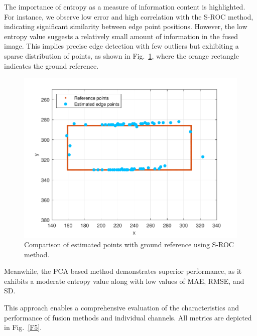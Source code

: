 \documentclass{article}
\begin{document}
The importance of entropy  as a measure of information content is highlighted. For instance,  we observe low error and high correlation with the S-ROC method, indicating significant similarity between edge point positions. However, the low entropy value suggests a relatively small amount of information in the fused image. This implies precise edge detection with few outliers but exhibiting a sparse distribution of points, as shown in Fig.~\ref{F4}, where the orange rectangle indicates the ground reference.  \vspace{-0.45cm}
\begin{figure}[H] 
\centering
	\includegraphics[scale=0.5]{figures/roc_f.pdf}\vspace{-1.5mm} 
	\caption{Comparison of estimated points with ground reference using S-ROC method.}
	\label{F4}
\end{figure}
Meanwhile, the PCA based method demonstrates superior performance, as it exhibits a moderate entropy value along with low values of MAE, RMSE, and SD.

This approach enables a comprehensive evaluation of the characteristics and performance of fusion methods and individual channels. All metrics are depicted in Fig.~\ref{F5}. 
\end{document}
